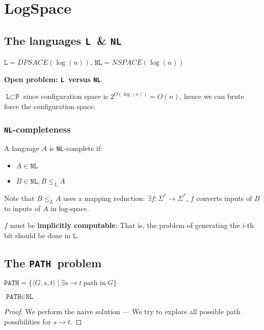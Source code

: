 \newcommand{\ptime}{\texttt{P}}
\newcommand{\logspace}{\texttt{L}}
\newcommand{\nlogspace}{\texttt{NL}}
\newcommand{\ph}{\texttt{PH}}
\newcommand{\pathproblem}{\texttt{PATH}}
\chapter{LogSpace}
\section{The languages \logspace~\& \nlogspace}

$\logspace = DPSACE(\log (n))$, $\nlogspace = NSPACE(\log(n))$


\textbf{Open problem: \logspace~versus \nlogspace}.

$\logspace \subset \ptime$ since configuration space is $2^{O(\log(n))} = O(n)$,
hence we can brute force the configuration space.

\subsection{\nlogspace-completeness}
A language $A$ is \nlogspace-complete if:
\begin{itemize}
    \item $A \in \nlogspace$
    \item $B \in \nlogspace, B \leq_L A$
\end{itemize}

Note that $B \leq_L A$ uses a mapping reduction: $\exists f: \Sigma^* \to \Sigma^*$,
$f$ converts inputs of $B$ to inputs of $A$ in log-space.

$f$ must be \textbf{implicitly computable}: That is, the problem of generating
the $i$-th bit should be done in $\logspace$.


\section{The \pathproblem~problem}
$\pathproblem = \{ \langle G, s, t \rangle~\vert~\exists s \to t~\text{path in}~G \}$

\begin{theorem}
    $\pathproblem \in \nlogspace$
\end{theorem}

\begin{proof}
We perform the naive solution --- We try to explore all possible path possibilities for $s \to t$.
\end{proof}


